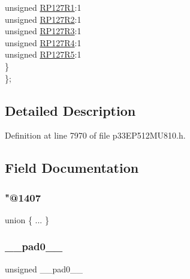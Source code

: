 \begin{DoxyCompactItemize}
\begin{tabbing}
\>\>unsigned \hyperlink{structtag_r_p_o_r15_b_i_t_s_a3e24ac2fa4c9fbe44f50e1dc292729db}{RP127R1}:1\\
\>\>unsigned \hyperlink{structtag_r_p_o_r15_b_i_t_s_a02e32cbbd25e67ed98982f99eddd8b5d}{RP127R2}:1\\
\>\>unsigned \hyperlink{structtag_r_p_o_r15_b_i_t_s_a7a213d942d454b5212f1b101a6462175}{RP127R3}:1\\
\>\>unsigned \hyperlink{structtag_r_p_o_r15_b_i_t_s_ac27a8a2d2b38867de9975fe91d200bdd}{RP127R4}:1\\
\>\>unsigned \hyperlink{structtag_r_p_o_r15_b_i_t_s_a2c8700d9a8720d42270043791f8dc97b}{RP127R5}:1\\
\>\} \\
\}; \\

\end{tabbing}\end{DoxyCompactItemize}


\subsection{Detailed Description}


Definition at line 7970 of file p33\+E\+P512\+M\+U810.\+h.



\subsection{Field Documentation}
\mbox{\label{structtag_r_p_o_r15_b_i_t_s_a09f2f513f5b92a83a899e41bdbe7c04b}} 
\subsubsection{\texorpdfstring{"@1407}{@1407}}
{\footnotesize\ttfamily union \{ ... \} }

\mbox{\label{structtag_r_p_o_r15_b_i_t_s_adf71f3d8410c1f1dbbc96680a92c49af}} 
\subsubsection{\texorpdfstring{\+\_\+\+\_\+pad0\+\_\+\+\_\+}{\_\_pad0\_\_}}
{\footnotesize\ttfamily unsigned \+\_\+\+\_\+pad0\+\_\+\+\_\+}



